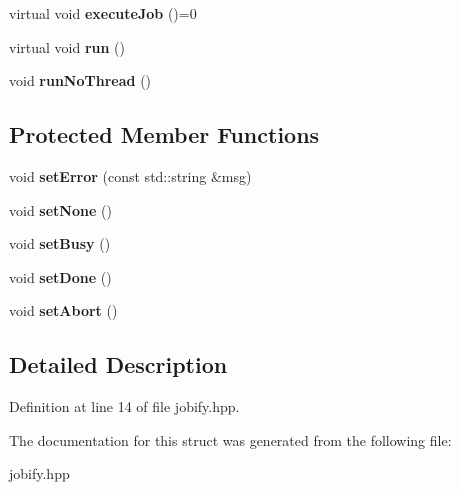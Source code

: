 \begin{DoxyCompactItemize}
\item 
\hypertarget{struct_status_job_a99748d85fb79590ac93d756e11c7a23b}{virtual void {\bfseries execute\-Job} ()=0}\label{struct_status_job_a99748d85fb79590ac93d756e11c7a23b}

\item 
\hypertarget{struct_status_job_a43292a61c894235e4d7c41468a1c67ba}{virtual void {\bfseries run} ()}\label{struct_status_job_a43292a61c894235e4d7c41468a1c67ba}

\item 
\hypertarget{struct_status_job_af02e101615feba1c7c573ffd47e4bf7f}{void {\bfseries run\-No\-Thread} ()}\label{struct_status_job_af02e101615feba1c7c573ffd47e4bf7f}

\end{DoxyCompactItemize}
\subsection*{Protected Member Functions}
\begin{DoxyCompactItemize}
\item 
\hypertarget{struct_status_job_adcf8da2ad775e9426112ed39db5f7d3b}{void {\bfseries set\-Error} (const std\-::string \&msg)}\label{struct_status_job_adcf8da2ad775e9426112ed39db5f7d3b}

\item 
\hypertarget{struct_status_job_a027e316e0d11862f130c153d86a7bcb2}{void {\bfseries set\-None} ()}\label{struct_status_job_a027e316e0d11862f130c153d86a7bcb2}

\item 
\hypertarget{struct_status_job_a7ffbcc5914a8de0f05e6277f557590ca}{void {\bfseries set\-Busy} ()}\label{struct_status_job_a7ffbcc5914a8de0f05e6277f557590ca}

\item 
\hypertarget{struct_status_job_a27329cdb3ecb7af96174c2d82990ee40}{void {\bfseries set\-Done} ()}\label{struct_status_job_a27329cdb3ecb7af96174c2d82990ee40}

\item 
\hypertarget{struct_status_job_abe811fbc93ef865a8cfe1b9e846c535f}{void {\bfseries set\-Abort} ()}\label{struct_status_job_abe811fbc93ef865a8cfe1b9e846c535f}

\end{DoxyCompactItemize}


\subsection{Detailed Description}


Definition at line 14 of file jobify.\-hpp.



The documentation for this struct was generated from the following file\-:\begin{DoxyCompactItemize}
\item 
jobify.\-hpp\end{DoxyCompactItemize}
